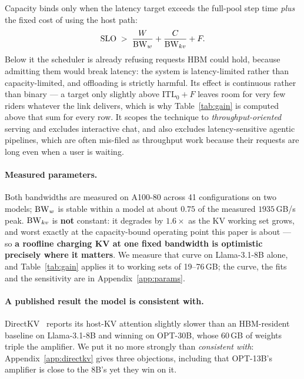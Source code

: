 Capacity binds only when the latency target exceeds the full-pool step time
\emph{plus} the fixed cost of using the host path:
%
\begin{equation}
\label{eq:gate}
\mathrm{SLO} \;>\; \frac{W}{\mathrm{BW}_w} + \frac{C}{\mathrm{BW}_{kv}} + F.
\end{equation}
%
Below it the scheduler is already refusing requests HBM could hold, because
admitting them would break latency: the system is latency-limited rather than
capacity-limited, and offloading is strictly harmful. Its effect is continuous
rather than binary --- a target only slightly above $\mathrm{ITL}_0 + F$ leaves room
for very few riders whatever the link delivers, which is why Table~\ref{tab:gain} is
computed above that sum for every row. It scopes the technique to
\emph{throughput-oriented} serving and excludes interactive chat, and also excludes
latency-sensitive agentic pipelines, which are often mis-filed as throughput work
because their requests are long even when a user is waiting.

\paragraph{Measured parameters.}
\label{sec:model:params}
Both bandwidths are measured on A100-80 across 41 configurations on two models;
$\mathrm{BW}_w$ is stable within a model at about $0.75$ of the measured $1935$\,GB/s peak.
$\mathrm{BW}_{kv}$ is \textbf{not} constant: it degrades by $1.6\times$ as the KV working
set grows, and worst exactly at the capacity-bound operating point this paper is
about --- so \textbf{a roofline charging KV at one fixed bandwidth is optimistic
precisely where it matters}. We measure that curve on Llama-3.1-8B alone, and
Table~\ref{tab:gain} applies it to working sets of 19--76\,GB; the curve, the fits
and the sensitivity are in Appendix~\ref{app:params}.

\paragraph{A published result the model is consistent with.}
\label{sec:model:directkv}
DirectKV~\cite{directkv} reports its host-KV attention slightly slower than an
HBM-resident baseline on Llama-3.1-8B and winning on OPT-30B, whose 60\,GB of
weights triple the amplifier. We put it no more strongly than \emph{consistent
with}: Appendix~\ref{app:directkv} gives three objections, including that OPT-13B's
amplifier is close to the 8B's yet they win on it.
